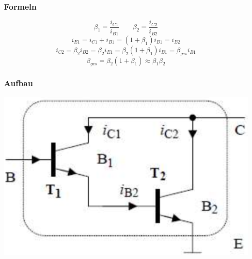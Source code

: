 \begin{minipage}{0.6\linewidth}
    \subsubsection{Formeln}
    \vspace{-0.5cm}
    \[ \beta_1 = \dfrac{i_{C1}}{i_{B1}} \qquad \beta_2 = \dfrac{i_{C2}}{i_{B2}} \]    
    \[ i_{E1} = i_{C1}+i_{B1}=(1+\beta_1)i_{B1} = i_{B2} \]
    \[ i_{C2} = \beta_2 i_{B2} = \beta_2 i_{E1} = \beta_2 (1 + \beta_1)i_{B1}=\beta_{ges}i_{B1} \]
    \[ \beta_{ges} = \beta_2(1 + \beta_1) \approx \beta_1 \beta_2 \]    
\end{minipage}
\begin{minipage}{0.3\linewidth}
    \subsubsection{Aufbau}
    \includegraphics[width=\linewidth]{images/darlingtonaufbau}
\end{minipage}

